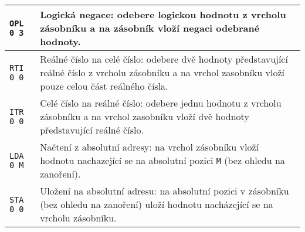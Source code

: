 \documentclass{article}
\begin{document}
\begin{longtable}{|l| p{10cm}|}
		\rule{0pt}{4ex} \texttt{OPL 0 3} & Logická negace: odebere logickou hodnotu z vrcholu zásobníku a na zásobník vloží negaci odebrané hodnoty. \\ \hline
		
		\rule{0pt}{3ex} \texttt{RTI 0 0} & Reálné číslo na celé číslo: odebere dvě hodnoty představující reálné číslo z vrcholu zásobníku a na vrchol zasobníku vloží pouze celou část reálného čísla. \\ \hline
		
		\rule{0pt}{3ex} \texttt{ITR 0 0} & Celé číslo na reálné číslo: odebere jednu hodnotu z vrcholu zásobníku a na vrchol zasobníku vloží dvě hodnoty představující reálné číslo. \\ \hline
		
		\rule{0pt}{3ex} \texttt{LDA 0 M} & Načtení z absolutní adresy: na vrchol zásobníku vloží hodnotu nachazející se na absolutní pozici \texttt{M} (bez ohledu na zanoření). \\ \hline
		
		\rule{0pt}{3ex} \texttt{STA 0 0} & Uložení na absolutní adresu: na absolutní pozici v zásobníku (bez ohledu na zanoření) uloží hodnotu nacházející se na vrcholu zásobníku. \\ \hline
	\end{longtable}
\end{document}
